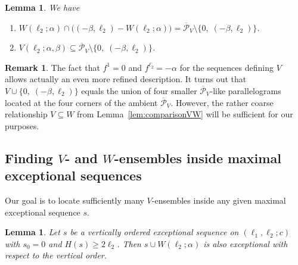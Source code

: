 \documentclass[11pt]{article}
\newtheorem{lemma}[theo]{Lemma}
\theoremstyle{definition}
\newtheorem{rema}[theo]{Remark}
\numberwithin{equation}{section}
\newcommand{\cP}{\mathcal{P}}
\newcommand{\ko}{\overline}
\newcommand{\xa}{\alpha}
\newcommand{\xb}{\beta}
\newcommand{\cl}{s}
\newcommand{\mes}{maximal exceptional sequence}
\newcommand{\wbox}{ensemble}
\begin{document}
\begin{lemma}
\label{lem:comparisonPW}
We have
\begin{enumerate}
\item[(i)] $W(\ell_2;\xa)\cap\big((-\xb,\ell_2) - W(\ell_2;\xa)\big)
= \ko{\cP}_V\setminus \big\{0,\;(-\xb,\ell_2)\big\}$.
\vspace{1ex}
\item[(ii)] $V(\ell_2;\xa,\xb)\subseteq \ko{\cP}_V\setminus
\big\{0,\;(-\xb,\ell_2)\big\}$.
\end{enumerate}
\end{lemma}

\begin{rema}
\label{rem:shapeV}
The fact that $f^1=0$ and $f^{\ell_2}=-\xa$ for the sequences 
defining $V$ allows actually an even more
refined description. It turns out that 
$V\cup\big\{0,\;(-\xb,\ell_2)\big\}$ equals the union 
of four smaller $\ko{\cP}_V$-like parallelograms
located at the four corners of the ambient $\ko{\cP}_V$. However, 
the rather coarse relationship 
$V\subseteq W$ from Lemma~\ref{lem:comparisonVW} will be
sufficient for our purposes.
\end{rema}

\subsection{Finding \texorpdfstring{$V$}{V}- and \texorpdfstring{$W$-{\wbox}}{W}s inside \texorpdfstring{\mes s}{s}}
\label{subsec:BoxesAndMES}
Our goal is to {locate} sufficiently 
many $V$-{\wbox}s inside any given {\mes} $\cl$.

\begin{lemma}
\label{lem:InsertWBox}
Let $\cl$ be a vertically ordered exceptional sequence on 
$(\ell_1,\ell_2;c)$ with $\cl_0=0$ and $H(\cl)\geq2\ell_2$. 
Then $\cl\cup W(\ell_2;\alpha)$ is also exceptional with 
respect to the vertical order.
\end{lemma}
\end{document}
